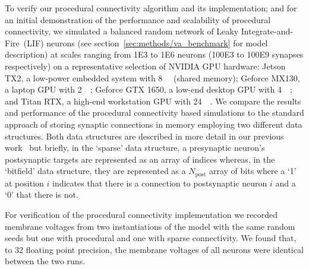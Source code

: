 \documentclass[9pt,a4paper]{amsart}
\begin{document}
To verify our procedural connectivity algorithm and its implementation; and for an initial demonstration of the performance and scalability of procedural connectivity, we simulated a balanced random network of Leaky Integrate-and-Fire~(LIF) neurons (see section~\ref{sec:methods/va_benchmark} for model description) at scales ranging from \num{1E3} to \num{1E6} neurons (\num{100E3} to \num{100E9} synapses respectively) on a representative selection of NVIDIA GPU hardware:
Jetson TX2, a low-power embedded system with \SI{8}{\giga\byte} (shared memory);
Geforce MX130, a laptop GPU with \SI{2}{\giga\byte};
Geforce GTX 1650, a low-end desktop GPU with \SI{4}{\giga\byte};
and Titan RTX, a high-end workstation GPU with \SI{24}{\giga\byte}.
We compare the results and performance of the procedural connectivity based simulations to the standard approach of storing synaptic connections in memory employing two different data structures.
Both data structures are described in more detail in our previous work~\citep{Knight2018} but briefly, in the `sparse' data structure, a presynaptic neuron's postsynaptic targets are represented as an array of indices whereas, in the `bitfield' data structure, they are represented as a $N_{\text{post}}$ array of bits where a `1' at position $i$ indicates that there is a connection to postsynaptic neuron $i$ and a `0' that there is not.

For verification of the procedural connectivity implementation we recorded membrane voltages from two instantiations of the model with the same random seeds but one with procedural and one with sparse connectivity.
We found that, to \SI{32}{\bit} floating point precision, the membrane voltages of all neurons were identical between the two runs.
\end{document}
